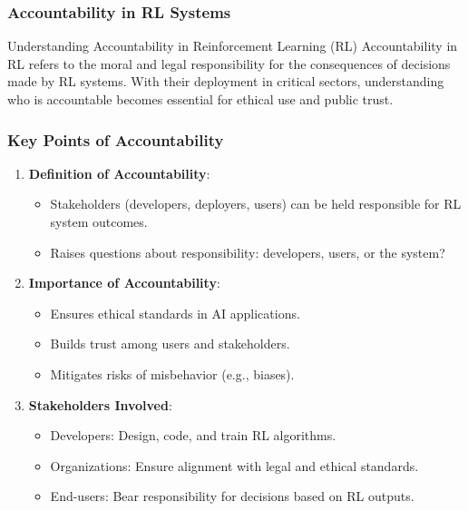 \documentclass{beamer}
\begin{document}
\begin{frame}[fragile]
    \frametitle{Accountability in RL Systems}
    \begin{block}{Understanding Accountability in Reinforcement Learning (RL)}
        Accountability in RL refers to the moral and legal responsibility for the consequences of decisions made by RL systems. With their deployment in critical sectors, understanding who is accountable becomes essential for ethical use and public trust.
    \end{block}
\end{frame}

\begin{frame}[fragile]
    \frametitle{Key Points of Accountability}
    \begin{enumerate}
        \item \textbf{Definition of Accountability}:
            \begin{itemize}
                \item Stakeholders (developers, deployers, users) can be held responsible for RL system outcomes.
                \item Raises questions about responsibility: developers, users, or the system?
            \end{itemize}
        \item \textbf{Importance of Accountability}:
            \begin{itemize}
                \item Ensures ethical standards in AI applications.
                \item Builds trust among users and stakeholders.
                \item Mitigates risks of misbehavior (e.g., biases).
            \end{itemize}
        \item \textbf{Stakeholders Involved}:
            \begin{itemize}
                \item Developers: Design, code, and train RL algorithms.
                \item Organizations: Ensure alignment with legal and ethical standards.
                \item End-users: Bear responsibility for decisions based on RL outputs.
            \end{itemize}
    \end{enumerate}
\end{frame}
\end{document}
